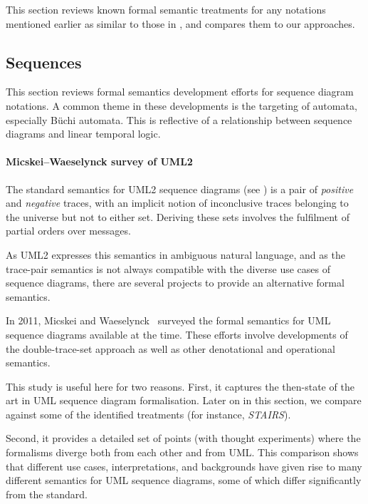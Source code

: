 
This section reviews known formal semantic treatments for any notations
mentioned earlier as similar to those in \langname, and compares them to
our approaches.

\subsection{Sequences}\label{sec:semantics-comparison-review-seq}

This section reviews formal semantics development efforts for sequence diagram
notations.
A common theme in these developments is the
targeting of automata, especially B\"uchi automata.  This
is reflective of a relationship between sequence diagrams
and linear temporal logic.

\paragraph{Micskei--Waeselynck survey of UML2}

The standard semantics for UML2 sequence diagrams (see
\cite[\S 17.2.3.1]{uml251}) is a pair of \emph{positive} and \emph{negative}
traces, with an implicit notion of inconclusive traces belonging to
the universe but not to either set.  Deriving these sets involves the
fulfilment of partial orders over messages.

As UML2 expresses this
semantics in ambiguous natural language, and as the trace-pair
semantics is not always compatible with the diverse use cases of sequence
diagrams, there are several projects to provide an alternative formal semantics.

In 2011, Micskei and Waeselynck~\cite{Micskei11-UMLSeqSemaSurvey} surveyed
the formal semantics for UML sequence diagrams available at the time.  These
efforts involve developments of the double-trace-set approach as well as other
denotational and operational semantics.

This study is useful here for two reasons.  First, it captures the then-state of
the art in UML sequence diagram formalisation.  Later on in this section,
we compare against some of the identified treatments (for instance,
\emph{STAIRS}).

Second, it provides a detailed
set of points (with thought experiments) where the formalisms diverge both from
each other and from UML.
This comparison shows that different use cases, interpretations, and backgrounds
have given rise to many different semantics for UML sequence diagrams, some
of which differ significantly from the standard.


